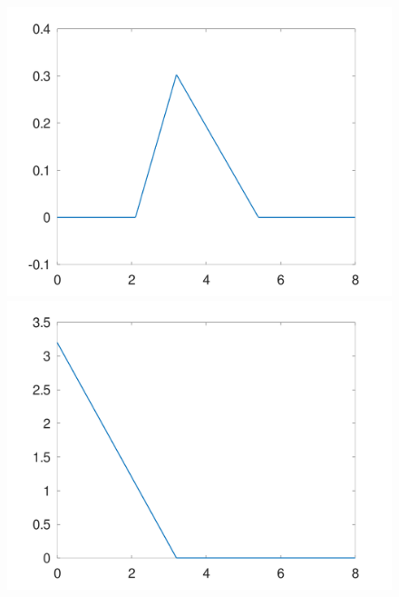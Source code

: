 \documentclass{article}
\begin{document}
\begin{figure}[!htbp]
{\begin{minipage}[b]{.3\linewidth}
  \includegraphics[scale=0.1]{figures/Assignment_G_N1_2_0.png}
  \end{minipage}
  }
  \subfigure
  {
  \begin{minipage}[b]{.3\linewidth}
    \flushleft
  \includegraphics[scale=0.1]{figures/Assignment_G_N1_0_1.png}
  \end{minipage}
  }
\end{figure}
\end{document}

